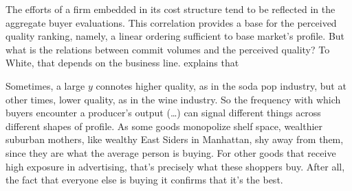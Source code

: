 \documentclass[a4paper, 12pt, openright, oneside, german, french, brazil, english, article]{abntex2}
\begin{document}
	
	The efforts of a firm embedded in its cost structure tend to be reflected in the aggregate buyer evaluations. This correlation provides a base for the perceived quality ranking, namely, a linear ordering sufficient to base market's profile. But what is the relations between commit volumes and the perceived quality? To White, that depends on the business line.  explains that
	
	
	\begin{citacao}
		Sometimes, a large $y$ connotes higher quality, as in the soda pop industry, but at other times, lower quality, as in the wine industry. So the frequency with which buyers encounter a producer's output (\dots) can signal different things across different shapes of profile. As some goods monopolize shelf space, wealthier suburban mothers, like wealthy East Siders in Manhattan, shy away from them, since they are what the average person is buying. For other goods that receive high exposure in advertising, that's precisely what these shoppers buy. After all, the fact that everyone else is buying it confirms that it's the best. \cite[p. 15]{white2002markets}
	\end{citacao}
	
	
\end{document}
